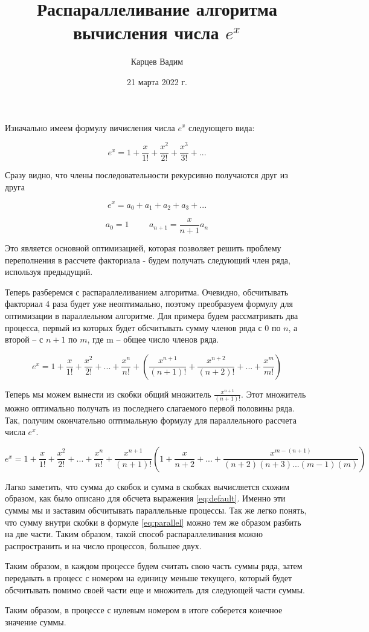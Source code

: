 \documentclass[12pt]{article}
\author{Карцев Вадим}
\date{21 марта 2022 г.}
\title{Распараллеливание алгоритма вычисления числа $e^x$}
\begin{document}
  \maketitle

  Изначально имеем формулу вичисления числа $e^x$ следующего вида:

  \begin{equation} \label{eq:default}
    e^x = 1 + \frac{x}{1!} + \frac{x^2}{2!} + \frac{x^3}{3!} + ...
  \end{equation}

  Сразу видно, что члены последовательности рекурсивно получаются друг из друга

  $$
    e^x = a_0 + a_1 + a_2 + a_3 + ...
  $$

  $$
    a_0 = 1 \hspace{1cm}
    a_{n+1} = \frac{x}{n+1} a_n
  $$

  Это является основной оптимизацией, которая позволяет решить проблему
  переполнения в рассчете факториала - будем получать следующий член ряда,
  используя предыдущий.

  Теперь разберемся с распараллеливанием алгоритма. Очевидно, обсчитывать
  факториал 4 раза будет уже неоптимально, поэтому преобразуем формулу для
  оптимизации в параллельном алгоритме. Для примера будем рассматривать два
  процесса, первый из которых будет обсчитывать сумму членов ряда с $0$ по $n$,
  а второй -- с $n+1$ по $m$, где m -- общее число членов ряда.

  \begin{equation}
    e^x = 1 + \frac{x}{1!} + \frac{x^2}{2!} + ... + \frac{x^n}{n!} +
    \left(\frac{x^{n+1}}{(n+1)!} + \frac{x^{n+2}}{(n+2)!} + ... +
    \frac{x^m}{m!}\right)
  \end{equation}

  Теперь мы можем вынести из скобки общий множитель $\frac{x^{n+1}}{(n+1)!}$.
  Этот множитель можно оптимально получать из последнего слагаемого первой
  половины ряда. Так, получим окончательно оптимальную формулу для параллельного
  рассчета числа $e^x$.

  \begin{equation} \label{eq:parallel}
    e^x = 1 + \frac{x}{1!} + \frac{x^2}{2!} + ... + \frac{x^n}{n!} +
    \frac{x^{n+1}}{(n+1)!} \left(1 + \frac{x}{n+2} + ... +
    \frac{x^{m-(n+1)}}{(n+2)(n+3)...(m-1)(m)}\right)
  \end{equation}

  Лагко заметить, что сумма до скобок и сумма в скобках вычисляется схожим
  образом, как было описано для обсчета выражения \ref{eq:default}. Именно эти
  суммы мы и заставим обсчитывать параллельные процессы. Так же легко понять,
  что сумму внутри скобки в формуле \ref{eq:parallel} можно тем же образом
  разбить на две части. Таким образом, такой способ распараллеливания можно
  распространить и на число процессов, большее двух.

  Таким образом, в каждом процессе будем считать свою часть суммы ряда, затем
  передавать в процесс с номером на единицу меньше текущего, который будет
  обсчитывать помимо своей части еще и множитель для следующей части суммы.

  Таким образом, в процессе с нулевым номером в итоге соберется конечное
  значение суммы.
\end{document}
